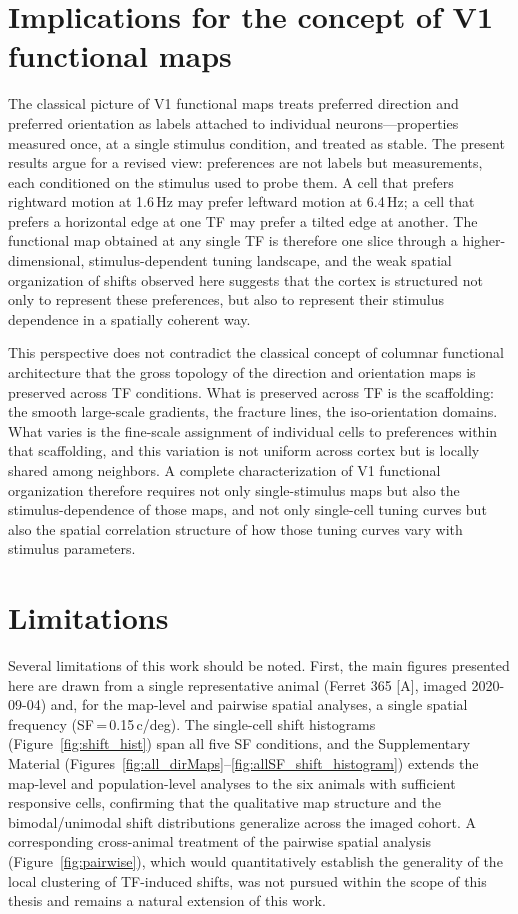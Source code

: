 \documentclass{brandeis-thesis3.3}
\begin{document}
\section{Implications for the concept of V1 functional maps}

The classical picture of V1 functional maps treats preferred
direction and preferred orientation as labels attached to
individual neurons---properties measured once, at a single
stimulus condition, and treated as stable. The present results
argue for a revised view: preferences are not labels but
measurements, each conditioned on the stimulus used to probe
them. A cell that prefers rightward motion at 1.6\,Hz may
prefer leftward motion at 6.4\,Hz; a cell that prefers a
horizontal edge at one TF may prefer a tilted edge at another.
The functional map obtained at any single TF is therefore one
slice through a higher-dimensional, stimulus-dependent tuning
landscape, and the weak spatial organization of shifts
observed here suggests that the cortex is structured not only
to represent these preferences, but also to represent their
stimulus dependence in a spatially coherent way.

This perspective does not contradict the classical concept of
columnar functional architecture that the gross topology of the
direction and orientation maps is preserved across TF
conditions. What is preserved across TF is
the scaffolding: the smooth large-scale gradients, the fracture
lines, the iso-orientation domains. What varies is the
fine-scale assignment of individual cells to preferences within
that scaffolding, and this variation is not uniform across
cortex but is locally shared among neighbors. A complete
characterization of V1 functional organization therefore
requires not only single-stimulus maps but also the
stimulus-dependence of those maps, and not only single-cell
tuning curves but also the spatial correlation structure of
how those tuning curves vary with stimulus parameters.

\section{Limitations}
Several limitations of this work should be noted. First, the
main figures presented here are drawn from a single
representative animal (Ferret 365 [A], imaged 2020-09-04) and,
for the map-level and pairwise spatial analyses, a single
spatial frequency (SF\,=\,0.15\,c/deg). The single-cell shift
histograms (Figure~\ref{fig:shift_hist}) span
all five SF conditions, and the Supplementary Material
(Figures~\ref{fig:all_dirMaps}--\ref{fig:allSF_shift_histogram})
extends the map-level and population-level analyses to the six
animals with sufficient responsive cells, confirming that the
qualitative map structure and the bimodal/unimodal shift
distributions generalize across the imaged cohort. A
corresponding cross-animal treatment of the pairwise spatial
analysis (Figure~\ref{fig:pairwise}), which would quantitatively
establish the generality of the local clustering of TF-induced
shifts, was not pursued within the scope of this thesis and
remains a natural extension of this work.
\end{document}

